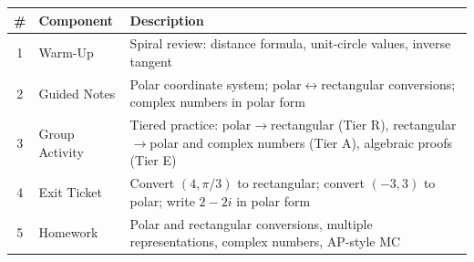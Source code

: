 \documentclass[10pt]{article}
\begin{document}
\begin{tocbox}
\small
\renewcommand{\arraystretch}{1.5}
\begin{tabularx}{\linewidth}{@{} c l X @{}}
\rowcolor{sky}
\textbf{\#} & \textbf{Component} & \textbf{Description} \\
\midrule
1 & Warm-Up        & Spiral review: distance formula, unit-circle values, inverse tangent \\
2 & Guided Notes   & Polar coordinate system; polar$\leftrightarrow$rectangular conversions; complex numbers in polar form \\
3 & Group Activity & Tiered practice: polar$\to$rectangular (Tier R), rectangular$\to$polar and complex numbers (Tier A), algebraic proofs (Tier E) \\
4 & Exit Ticket    & Convert $(4,\pi/3)$ to rectangular; convert $(-3,3)$ to polar; write $2-2i$ in polar form \\
5 & Homework       & Polar and rectangular conversions, multiple representations, complex numbers, AP-style MC \\
\end{tabularx}
\end{tocbox}
\end{document}
